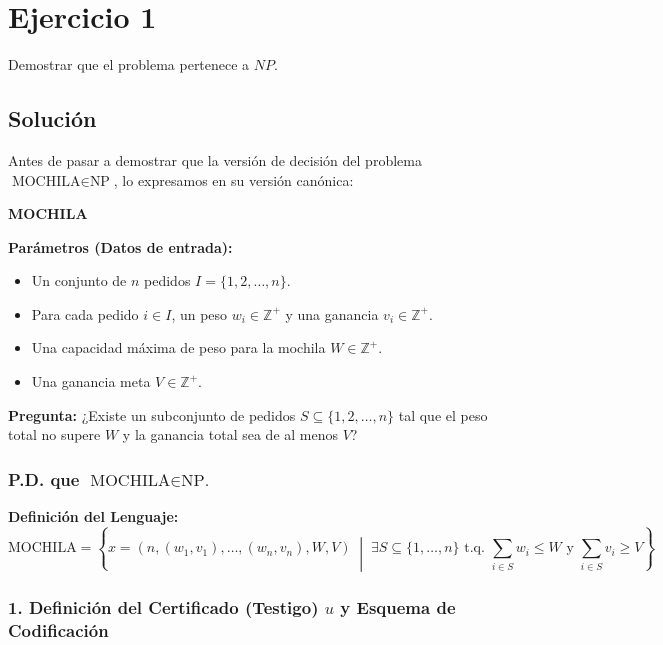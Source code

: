 \section{Ejercicio 1}

\begin{tcolorbox}[enunciado]
Demostrar que el problema pertenece a $NP$.
\end{tcolorbox}

\subsection{Solución}

Antes de pasar a demostrar que la versión de decisión del problema $\text{MOCHILA} \in \text{NP}$, lo expresamos en su versión canónica:

\vspace{0.3cm}
\noindent\textbf{MOCHILA}

\textbf{Parámetros (Datos de entrada):}
\begin{itemize}[leftmargin=*]
    \item Un conjunto de $n$ pedidos $I = \{1, 2, \dots, n\}$.
    \item Para cada pedido $i \in I$, un peso $w_i \in \mathbb{Z}^+$ y una ganancia $v_i \in \mathbb{Z}^+$.
    \item Una capacidad máxima de peso para la mochila $W \in \mathbb{Z}^+$.
    \item Una ganancia meta $V \in \mathbb{Z}^+$.
\end{itemize}

\textbf{Pregunta:} ¿Existe un subconjunto de pedidos $S \subseteq \{1, 2, \dots, n\}$ tal que el peso total no supere $W$ y la ganancia total sea de al menos $V$?

\vspace{0.3cm}
{\color{unamBlue!80!black} \subsubsection*{P.D. que $\text{MOCHILA} \in \text{NP.}$}}

\textbf{Definición del Lenguaje:}
\[ \text{MOCHILA} = \left\{ x = (n, (w_1, v_1), \dots, (w_n, v_n), W, V) \;\middle|\; \exists S \subseteq \{1, \dots, n\} \text{ t.q. } \sum_{i \in S} w_i \le W \text{ y } \sum_{i \in S} v_i \ge V \right\} \]

\subsubsection*{1. Definición del Certificado (Testigo) $u$ y Esquema de Codificación}


